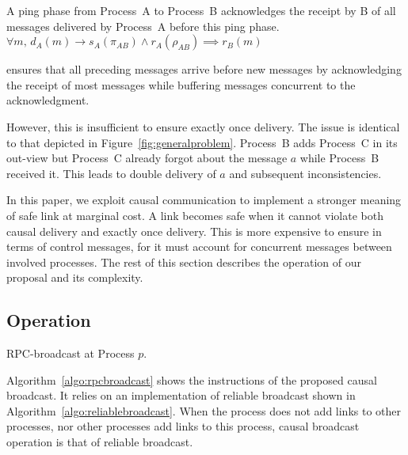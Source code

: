 \begin{lemma}
  A ping phase from Process~A to Process~B acknowledges the receipt by B of all
  messages delivered by Process~A before this ping phase.
  $\forall m,\, d_A(m) \rightarrow s_A(\pi_{AB}) \wedge r_A(\rho_{AB}) \implies
  r_B(m)$
\end{lemma}

\PCBROADCAST ensures that all preceding messages arrive before new messages by
acknowledging the receipt of most messages while buffering messages concurrent
to the acknowledgment.



However, this is insufficient to ensure exactly once delivery. The issue is
identical to that depicted in Figure~\ref{fig:generalproblem}. Process~B adds
Process~C in its out-view but Process~C already forgot about the message $a$
while Process~B received it. This leads to double delivery of $a$ and subsequent
inconsistencies.

In this paper, we exploit causal communication to implement a stronger meaning
of safe link at marginal cost. A link becomes safe when it cannot violate both
causal delivery and exactly once delivery.  This is more expensive to ensure in
terms of control messages, for it must account for concurrent messages between
involved processes. The rest of this section describes the operation of our
proposal and its complexity.



\subsection{Operation}


\begin{algorithm}[h]
  
  \caption{\label{algo:rpcbroadcast}RPC-broadcast at Process $p$.}
\end{algorithm}


Algorithm~\ref{algo:rpcbroadcast} shows the instructions of the proposed causal
broadcast. It relies on an implementation of reliable broadcast shown in
Algorithm~\ref{algo:reliablebroadcast}. When the process does not add links to
other processes, nor other processes add links to this process, causal broadcast
operation is that of reliable broadcast. 


